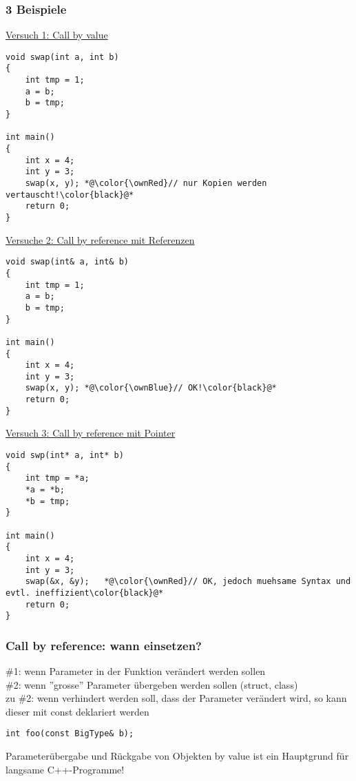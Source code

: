 \subsubsection{3 Beispiele\hfill}
\label{sec:3 Beispiele}
\underline{Versuch 1: Call by value}
\noindent
\begin{minipage}{\linewidth}
\begin{lstlisting}
void swap(int a, int b)
{
	int tmp = 1;
	a = b;
	b = tmp;
}

int main()
{
	int x = 4;
	int y = 3;
	swap(x, y);	*@\color{\ownRed}// nur Kopien werden vertauscht!\color{black}@*
	return 0;
}
\end{lstlisting}
\end{minipage}
\underline{Versuche 2: Call by reference mit Referenzen}
\noindent
\begin{minipage}{\linewidth}
\begin{lstlisting}
void swap(int& a, int& b)
{
	int tmp = 1;
	a = b;
	b = tmp;
}

int main()
{
	int x = 4;
	int y = 3;
	swap(x, y);	*@\color{\ownBlue}// OK!\color{black}@*
	return 0;
}
\end{lstlisting}
\end{minipage}
\underline{Versuch 3: Call by reference mit Pointer}
\noindent
\begin{minipage}{\linewidth}
\begin{lstlisting}
void swp(int* a, int* b)
{
	int tmp = *a;
	*a = *b;
	*b = tmp;
}

int main()
{
	int x = 4;
	int y = 3;
	swap(&x, &y);	*@\color{\ownRed}// OK, jedoch muehsame Syntax und evtl. ineffizient\color{black}@*
	return 0;
}
\end{lstlisting}
\end{minipage}

\subsubsection{Call by reference: wann einsetzen?\hfill}
\label{sec:Call by reference: wann einsetzen?}
\#1: wenn Parameter in der Funktion verändert werden sollen\\
\#2: wenn ''grosse'' Parameter übergeben werden sollen (struct, class)\\
zu \#2: wenn verhindert werden soll, dass der Parameter verändert wird, so kann dieser mit const deklariert werden\\
\noindent
\begin{minipage}{\linewidth}
\begin{lstlisting}
int foo(const BigType& b);
\end{lstlisting}
\end{minipage}
\begin{achtung}
Parameterübergabe und Rückgabe von Objekten by value ist ein Hauptgrund für langsame C++-Programme!
\end{achtung}

